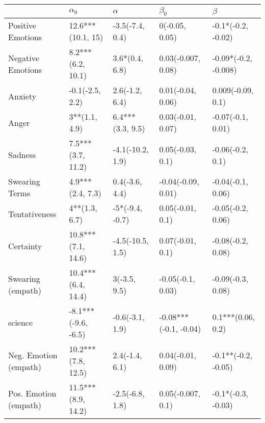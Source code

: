 \begin{tabular}{lllll}
\toprule
{} &           $\alpha_0$ &          $\alpha$ &              $\beta_0$ &               $\beta$ \\
\midrule
Positive Emotions     &    12.6***(10.1, 15) &   -3.5(-7.4, 0.4) &         0(-0.05, 0.05) &    -0.1*(-0.2, -0.02) \\
Negative Emotions     &    8.2***(6.2, 10.1) &    3.6*(0.4, 6.8) &     0.03(-0.007, 0.08) &  -0.09*(-0.2, -0.008) \\
Anxiety               &      -0.1(-2.5, 2.2) &    2.6(-1.2, 6.4) &      0.01(-0.04, 0.06) &     0.009(-0.09, 0.1) \\
Anger                 &        3**(1.1, 4.9) &  6.4***(3.3, 9.5) &      0.03(-0.01, 0.07) &     -0.07(-0.1, 0.01) \\
Sadness               &    7.5***(3.7, 11.2) &  -4.1(-10.2, 1.9) &       0.05(-0.03, 0.1) &      -0.06(-0.2, 0.1) \\
Swearing Terms        &     4.9***(2.4, 7.3) &    0.4(-3.6, 4.4) &     -0.04(-0.09, 0.01) &     -0.04(-0.1, 0.06) \\
Tentativeness         &        4**(1.3, 6.7) &   -5*(-9.4, -0.7) &       0.05(-0.01, 0.1) &     -0.05(-0.2, 0.06) \\
Certainty             &   10.8***(7.1, 14.6) &  -4.5(-10.5, 1.5) &       0.07(-0.01, 0.1) &     -0.08(-0.2, 0.08) \\
Swearing (empath)     &   10.4***(6.4, 14.4) &      3(-3.5, 9.5) &      -0.05(-0.1, 0.03) &     -0.09(-0.3, 0.08) \\
science               &  -8.1***(-9.6, -6.5) &   -0.6(-3.1, 1.9) &  -0.08***(-0.1, -0.04) &     0.1***(0.06, 0.2) \\
Neg. Emotion (empath) &   10.2***(7.8, 12.5) &    2.4(-1.4, 6.1) &      0.04(-0.01, 0.09) &   -0.1**(-0.2, -0.05) \\
Pos. Emotion (empath) &   11.5***(8.9, 14.2) &   -2.5(-6.8, 1.8) &      0.05(-0.007, 0.1) &    -0.1*(-0.3, -0.03) \\
\bottomrule
\end{tabular}
